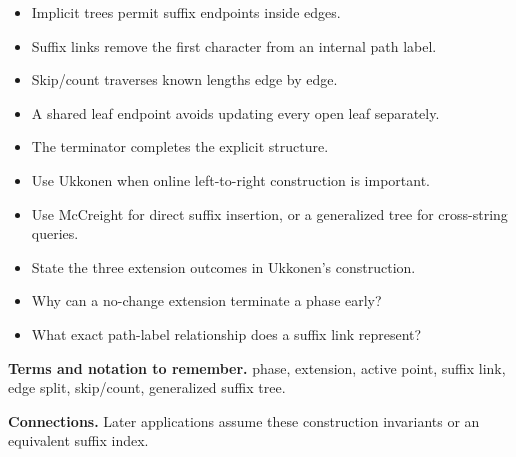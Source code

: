 \documentclass[11pt]{article}
\begin{document}
\begin{tcolorbox}[enhanced,breakable,title={Key takeaways},
  colback=white,colframe=Primary,fonttitle=\small\sffamily\bfseries,fontupper=\footnotesize,
  boxsep=0.6mm,left=1.5mm,right=1.5mm,top=1mm,bottom=1mm,before skip=3pt,after skip=3pt]
\begin{itemize}
  \item Implicit trees permit suffix endpoints inside edges.
  \item Suffix links remove the first character from an internal path label.
  \item Skip/count traverses known lengths edge by edge.
  \item A shared leaf endpoint avoids updating every open leaf separately.
  \item The terminator completes the explicit structure.
\end{itemize}
\end{tcolorbox}

\begin{tcolorbox}[enhanced,breakable,title={Algorithm selection / when to use this},
  colback=Primary!3,colframe=Primary,fonttitle=\small\sffamily\bfseries,fontupper=\footnotesize,
  boxsep=0.6mm,left=1.5mm,right=1.5mm,top=1mm,bottom=1mm,before skip=3pt,after skip=3pt]
\begin{itemize}
  \item Use Ukkonen when online left-to-right construction is important.
  \item Use McCreight for direct suffix insertion, or a generalized tree for cross-string queries.
\end{itemize}
\end{tcolorbox}

\begin{tcolorbox}[enhanced,breakable,title={Self-test questions},
  colback=white,colframe=Accent,fonttitle=\small\sffamily\bfseries,fontupper=\footnotesize,
  boxsep=0.6mm,left=1.5mm,right=1.5mm,top=1mm,bottom=1mm,before skip=3pt,after skip=3pt]
\begin{itemize}
  \item State the three extension outcomes in Ukkonen's construction.
  \item Why can a no-change extension terminate a phase early?
  \item What exact path-label relationship does a suffix link represent?
\end{itemize}
\end{tcolorbox}

{\footnotesize
\textbf{Terms and notation to remember.} phase, extension, active point, suffix link, edge split, skip/count, generalized suffix tree.

\textbf{Connections.} Later applications assume these construction invariants or an equivalent suffix index.
}
\end{document}
